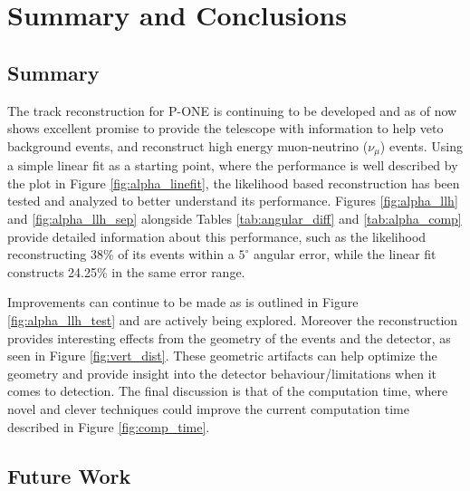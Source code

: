 \chapter{Summary and Conclusions}\label{ch:Conclusion}


\section{Summary}
The track reconstruction for P-ONE is continuing to be developed and as of now shows excellent promise to provide the telescope with information to help veto background events, and reconstruct high energy muon-neutrino ($\nu_{\mu}$) events. Using a simple linear fit as a starting point, where the performance is well described by the plot in Figure \ref{fig:alpha_linefit}, the likelihood based reconstruction has been tested and analyzed to better understand its performance. Figures \ref{fig:alpha_llh} and \ref{fig:alpha_llh_sep} alongside Tables \ref{tab:angular_diff} and \ref{tab:alpha_comp} provide detailed information about this performance, such as the likelihood reconstructing 38\% of its events within a $5^{\circ}$ angular error, while the linear fit constructs 24.25\% in the same error range.

Improvements can continue to be made as is outlined in Figure \ref{fig:alpha_llh_test} and are actively being explored. Moreover the reconstruction provides interesting effects from the geometry of the events and the detector, as seen in Figure \ref{fig:vert_dist}. These geometric artifacts can help optimize the geometry and provide insight into the detector behaviour/limitations when it comes to detection. The final discussion is that of the computation time, where novel and clever techniques could improve the current computation time described in Figure \ref{fig:comp_time}. 

\section{Future Work}


